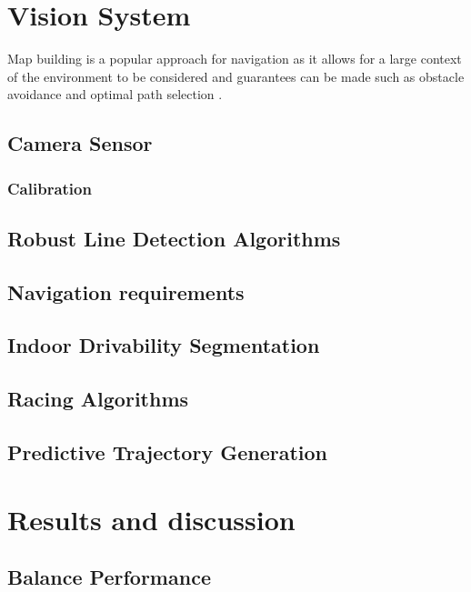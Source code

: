         \section{Vision System}

        Map building is a popular approach for navigation as it allows for a large 
        context of the environment to be considered and guarantees can be made such as obstacle avoidance and optimal path selection \cite{Macenski_2020}. 

        \subsection{Camera Sensor}

        \subsubsection{Calibration}

        \subsection{Robust Line Detection Algorithms}

        \subsection{Navigation requirements}

        \subsection{Indoor Drivability Segmentation}

        \subsection{Racing Algorithms}

        \subsection{Predictive Trajectory Generation}
    
    \pagebreak{}


  \section{Results and discussion} %
    \subsection{Balance Performance}

